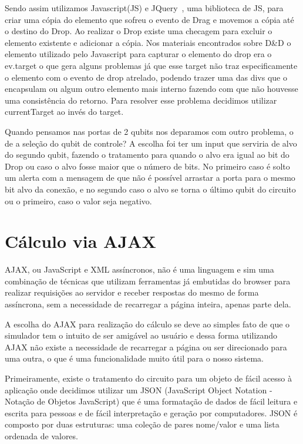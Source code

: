 \documentclass[a4paper, 12pt, oneside]{book}
\begin{document}
Sendo assim utilizamos Javascript(JS) e JQuery~\cite{jquery}, uma biblioteca de JS, para criar uma cópia do elemento que sofreu o evento de Drag e movemos a cópia até o destino do Drop. Ao realizar o Drop existe uma checagem para excluir o elemento existente e adicionar a cópia. Nos materiais encontrados sobre D\&{D} o elemento utilizado pelo Javascript para capturar o elemento do drop era o ev.target o que gera alguns problemas já que esse target não traz especificamente o elemento com o evento de drop atrelado, podendo trazer uma das divs que o encapsulam ou algum outro elemento mais interno fazendo com que não houvesse uma consistência do retorno. Para resolver esse problema decidimos utilizar currentTarget ao invés do target.

Quando pensamos nas portas de 2 qubits nos deparamos com outro problema, o de a seleção do qubit de controle? A escolha foi ter um input que serviria de alvo do segundo qubit, fazendo o tratamento para quando o alvo era igual ao bit do Drop ou caso o alvo fosse maior que o número de bits. No primeiro caso é solto um alerta com a mensagem de que não é possível arrastar a porta para o mesmo bit alvo da conexão, e no segundo caso o alvo se torna o último qubit do circuito ou o primeiro, caso o valor seja negativo.

\section{Cálculo via AJAX}

AJAX, ou JavaScript e XML assíncronos, não é uma linguagem e sim uma combinação de técnicas que utilizam ferramentas já embutidas do browser para realizar requisições ao servidor e receber respostas do mesmo de forma assíncrona, sem a necessidade de recarregar a página inteira, apenas parte dela.

A escolha do AJAX para realização do cálculo se deve ao simples fato de que o simulador tem o intuito de ser amigável ao usuário e dessa forma utilizando AJAX não existe a necessidade de recarregar a página ou ser direcionado para uma outra, o que é uma funcionalidade muito útil para o nosso sistema.

Primeiramente, existe o tratamento do circuito para um objeto de fácil acesso à aplicação onde decidimos utilizar um JSON (JavaScript Object Notation - Notação de Objetos JavaScript) que é uma formatação de dados de fácil leitura e escrita para pessoas e de fácil interpretação e geração por computadores. JSON é composto por duas estruturas: uma coleção de pares nome/valor e uma lista ordenada de valores.
\end{document}
